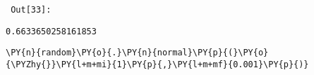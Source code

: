         {\par%
        \vspace{-1\smallerfontscale}%
        \noindent%
        \begin{minipage}{\cellleftmargin}%
    \hfill%
    {\smaller%
    \tt%
    \color{nbframe-out-prompt}%
    Out[33]:}%
    \hspace{\inputpadding}%
    \hspace{0em}%
    \hspace{3pt}%
    \end{minipage}%
        }%
    \begin{addmargin}[\cellleftmargin]{0em}%
    {\smaller%
    \vspace{-1\smallerfontscale}%
    
    
    
    \begin{verbatim}
0.6633650258161853
    \end{verbatim}

    
}%
    \end{addmargin}%

{\par%
\vspace{-1\baselineskip}%
}%
\begin{notebookcell}[34]%
\begin{addmargin}[\cellleftmargin]{0em}%
{\smaller%
\par%
%
\vspace{-1\smallerfontscale}%
\begin{Verbatim}[commandchars=\\\{\}]
\PY{n}{random}\PY{o}{.}\PY{n}{normal}\PY{p}{(}\PY{o}{\PYZhy{}}\PY{l+m+mi}{1}\PY{p}{,}\PY{l+m+mf}{0.001}\PY{p}{)}
\end{Verbatim}
%
\par%
\vspace{-1\smallerfontscale}}%
\end{addmargin}
\end{notebookcell}

\par\vspace{1\smallerfontscale}%
    
